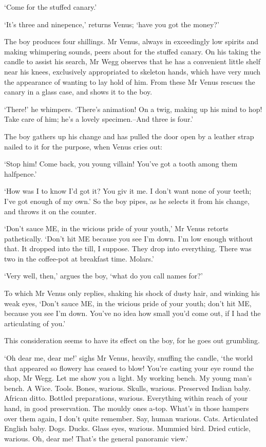 ‘Come for the stuffed canary.’

‘It’s three and ninepence,’ returns Venus; ‘have you got the money?’

The boy produces four shillings. Mr Venus, always in exceedingly low
spirits and making whimpering sounds, peers about for the stuffed
canary. On his taking the candle to assist his search, Mr Wegg observes
that he has a convenient little shelf near his knees, exclusively
appropriated to skeleton hands, which have very much the appearance of
wanting to lay hold of him. From these Mr Venus rescues the canary in a
glass case, and shows it to the boy.

‘There!’ he whimpers. ‘There’s animation! On a twig, making up his mind
to hop! Take care of him; he’s a lovely specimen.--And three is four.’

The boy gathers up his change and has pulled the door open by a leather
strap nailed to it for the purpose, when Venus cries out:

‘Stop him! Come back, you young villain! You’ve got a tooth among them
halfpence.’

‘How was I to know I’d got it? You giv it me. I don’t want none of your
teeth; I’ve got enough of my own.’ So the boy pipes, as he selects it
from his change, and throws it on the counter.

‘Don’t sauce ME, in the wicious pride of your youth,’ Mr Venus retorts
pathetically. ‘Don’t hit ME because you see I’m down. I’m low enough
without that. It dropped into the till, I suppose. They drop into
everything. There was two in the coffee-pot at breakfast time. Molars.’

‘Very well, then,’ argues the boy, ‘what do you call names for?’

To which Mr Venus only replies, shaking his shock of dusty hair, and
winking his weak eyes, ‘Don’t sauce ME, in the wicious pride of your
youth; don’t hit ME, because you see I’m down. You’ve no idea how small
you’d come out, if I had the articulating of you.’

This consideration seems to have its effect on the boy, for he goes out
grumbling.

‘Oh dear me, dear me!’ sighs Mr Venus, heavily, snuffing the candle,
‘the world that appeared so flowery has ceased to blow! You’re casting
your eye round the shop, Mr Wegg. Let me show you a light. My working
bench. My young man’s bench. A Wice. Tools. Bones, warious. Skulls,
warious. Preserved Indian baby. African ditto. Bottled preparations,
warious. Everything within reach of your hand, in good preservation.
The mouldy ones a-top. What’s in those hampers over them again, I don’t
quite remember. Say, human warious. Cats. Articulated English baby.
Dogs. Ducks. Glass eyes, warious. Mummied bird. Dried cuticle, warious.
Oh, dear me! That’s the general panoramic view.’

